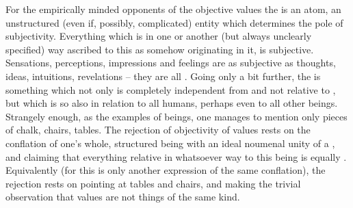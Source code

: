 For the empirically minded opponents of the {objective values} the
 is an atom, an unstructured (even if, possibly, complicated)
entity which determines the pole of subjectivity.  Everything which is in one or
another (but always unclearly specified) way ascribed to this  as
somehow originating in it, is subjective.  Sensations, perceptions, impressions
and feelings are as subjective as thoughts, ideas, intuitions, revelations --
they are all .  Going only a bit further, the  is
something which not only is completely independent from and not relative to
, but which is so also in relation to all humans, perhaps even to all
other beings.  Strangely enough, as the examples of  beings, one
manages to mention only pieces of chalk, chairs, tables.  The rejection of
{objectivity} of values rests on the conflation of one's whole, structured being
with an ideal noumenal unity of a , and claiming that everything
relative in whatsoever way to this being is equally .
Equivalently (for this is only another expression of the same conflation), the
rejection rests on pointing at tables and chairs, and making the trivial
observation that values are not things of the same kind.

